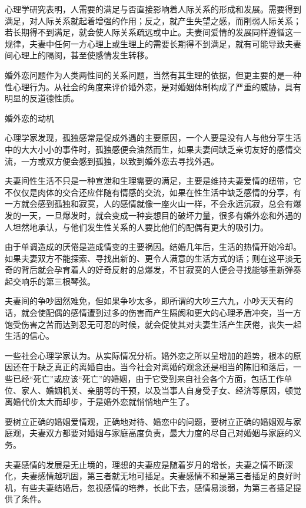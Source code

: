 \documentclass[12pt,UTF8,openany]{ctexbook}
\begin{document}
心理学研究表明，人需要的满足与否直接影响着人际关系的形成和发展。需要得到满足，对人际关系就起着增强的作用；反之，就产生失望之感，而削弱人际关系；若长期得不到满足，就会使人际关系疏远或中止。夫妻间爱情的发展同样遵循这一规律，夫妻中任何一方心理上或生理上的需要长期得不到满足，就有可能导致夫妻间心理上的隔阂，甚至使感情发生转移。

婚外恋问题作为人类两性间的关系问题，当然有其生理的依据，但更主要的是一种性心理行为。从社会的角度来评价婚外恋，是对婚姻体制构成了严重的威胁，具有明显的反道德性质。





婚外恋的动机


心理学家发现，孤独感常是促成外遇的主要原因，一个人要是没有人与他分享生活中的大大小小的事件时，孤独感便会油然而生，如果夫妻间缺乏亲切友好的感情交流，一方或双方便会感到孤独，以致到婚外恋去寻找外遇。

夫妻间性生活不只是一种宣泄和生理需要的满足，主要是维持夫妻爱情的纽带，它不仅仅是肉体的交合还应伴随有情感的交流，如果在性生活中缺乏感情的分享，有一方就会感到孤独和寂寞，人的感情就像一座火山一样，不会永远沉寂，总会有爆发的一天，一旦爆发时，就会变成一种妄想目的破坏力量，很多有婚外恋和外遇的人坦然地承认，与他们发生性关系的人要比他们的配偶有更大的吸引力。

由于单调造成的厌倦是造成情变的主要祸因。结婚几年后，生活的热情开始冷却。如果夫妻双方不能探索、寻找出新的、更令人满意的生活方式的话；则在这平淡无奇的背后就会孕育着人的好奇反射的总爆发，不甘寂寞的人便会寻找能够重新弹奏起交响乐的第三根琴弦。

夫妻间的争吵固然难免，但如果争吵太多，即所谓的大吵三六九，小吵天天有的话，就会使配偶的感情遭到过多的伤害而产生隔阂和更大的心理矛盾冲突，当一方饱受伤害之苦而达到忍无可忍的时候，就会促使其对夫妻生活产生厌倦，丧失一起生活的信心。

一些社会心理学家认为。从实际情况分析。婚外恋之所以呈增加的趋势，根本的原因还在于缺乏真正的离婚自由。当今社会对离婚的观念还是相当的陈旧和落后，一些已经“死亡”或应该“死亡”的婚姻，由于它受到来自社会各个方面，包括工作单位、家人、婚姻机关、亲朋等的干预，以及当事人自身受子女、经济等原因，顿觉离婚代价太大而却步，于是婚外恋就悄悄地产生了。

要树立正确的婚姻爱情观，正确地对待、婚恋中的问题，要树立正确的婚姻观与家庭观，夫妻双方都要对婚姻与家庭高度负责，最大力度的尽自己对婚姻与家庭的义务。

夫妻感情的发展是无止境的，理想的夫妻应是随着岁月的增长，夫妻之情不断深化，夫妻感情越巩固，第三者就无地可插足。夫妻感情不和是第三者插足的良好时机，有些夫妻结婚后，忽视感情的培养，长此下去，感情易淡弱，为第三者插足提供了条件。
\end{document}
